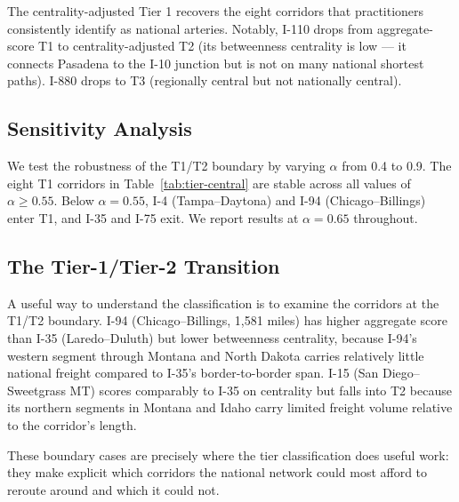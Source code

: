 The centrality-adjusted Tier 1 recovers the eight corridors that practitioners consistently identify as national arteries. Notably, I-110 drops from aggregate-score T1 to centrality-adjusted T2 (its betweenness centrality is low --- it connects Pasadena to the I-10 junction but is not on many national shortest paths). I-880 drops to T3 (regionally central but not nationally central).

\subsection{Sensitivity Analysis}
\label{sec:sensitivity}

We test the robustness of the T1/T2 boundary by varying $\alpha$ from 0.4 to 0.9. The eight T1 corridors in Table~\ref{tab:tier-central} are stable across all values of $\alpha \geq 0.55$. Below $\alpha = 0.55$, I-4 (Tampa--Daytona) and I-94 (Chicago--Billings) enter T1, and I-35 and I-75 exit. We report results at $\alpha = 0.65$ throughout.

\subsection{The Tier-1/Tier-2 Transition}

A useful way to understand the classification is to examine the corridors at the T1/T2 boundary. I-94 (Chicago--Billings, 1,581 miles) has higher aggregate score than I-35 (Laredo--Duluth) but lower betweenness centrality, because I-94's western segment through Montana and North Dakota carries relatively little national freight compared to I-35's border-to-border span. I-15 (San Diego--Sweetgrass MT) scores comparably to I-35 on centrality but falls into T2 because its northern segments in Montana and Idaho carry limited freight volume relative to the corridor's length.

These boundary cases are precisely where the tier classification does useful work: they make explicit which corridors the national network could most afford to reroute around and which it could not.
